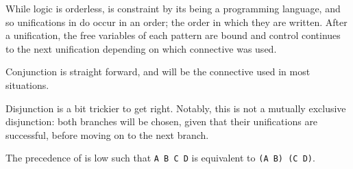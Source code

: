 While logic is orderless, \Law{} is constraint by its being a programming language,
and so unifications in \Law{} do occur in an order; the order in which they are
written. After a unification, the free variables of each pattern are bound and
control continues to the next unification depending on which connective was used.

\begin{prooftree}
\end{prooftree}

Conjunction is straight forward, and will be the connective used in most situations.

\begin{center}
    \parbox[t]{0.45\linewidth}{
    \begin{prooftree}
    \end{prooftree}
    }
    \quad
    \parbox[t]{0.45\linewidth}{
    \begin{prooftree}
    \end{prooftree}
}
\end{center}

Disjunction is a bit trickier to get right. Notably, this is not a mutually
exclusive disjunction: both branches will be chosen, given that their unifications
are successful, before moving on to the next branch.

The precedence of  is low such that \texttt{A  B  C  D}
is equivalent to \texttt{(A  B)  (C  D)}.

\begin{prooftree}
\end{prooftree}

\begin{prooftree}
\end{prooftree}

